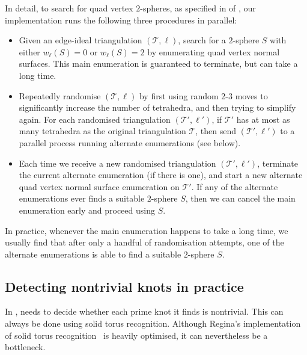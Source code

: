 \documentclass[10pt,a4paper]{amsart}
\newcommand{\tri}{\mathcal{T}}
\begin{document}
In detail, to search for quad vertex $2$-spheres, as specified in  of , our implementation runs the following three procedures in parallel:
\begin{itemize}
\item
Given an edge-ideal triangulation $(\tri,\ell)$, search for a $2$-sphere $S$ with either
$w_\ell(S)=0$ or $w_\ell(S)=2$ by enumerating quad vertex normal surfaces.
This main enumeration is guaranteed to terminate, but can take a long time.
\item
Repeatedly randomise $(\tri,\ell)$ by first using random 2-3 moves to significantly increase the number of tetrahedra, and then trying to simplify again.
For each randomised triangulation $(\tri',\ell')$, if $\tri'$ has at most as many tetrahedra as the original triangulation $\tri$,
then send $(\tri',\ell')$ to a parallel process running alternate enumerations (see below).
\item
Each time we receive a new randomised triangulation $(\tri',\ell')$, terminate the current alternate enumeration (if there is one),
and start a new alternate quad vertex normal surface enumeration on $\tri'$.
If any of the alternate enumerations ever finds a suitable $2$-sphere $S$, then we can cancel the main enumeration early and proceed using $S$.
\end{itemize}
In practice, whenever the main enumeration happens to take a long time, we usually find that after only a handful of randomisation attempts,
one of the alternate enumerations is able to find a suitable $2$-sphere $S$.

\subsection{Detecting nontrivial knots in practice}\label{ssec:nontrivialInPractice}

In ,  needs to decide whether each prime knot it finds is nontrivial.
This can always be done using solid torus recognition.
Although Regina's implementation of solid torus recognition~\cite{Regina,burton2012unknot} is heavily optimised, it can nevertheless be a bottleneck.
\end{document}
